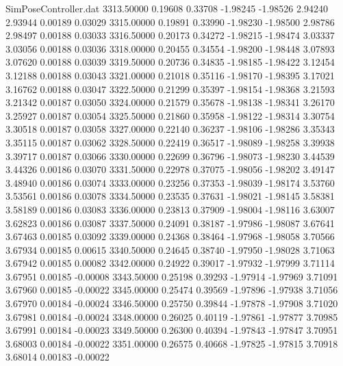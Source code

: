 \begin{filecontents}{SimPoseController.dat}
3313.50000    0.19608    0.33708    -1.98245   -1.98526    2.94240    2.93944    0.00189    0.03029
3315.00000    0.19891    0.33990    -1.98230   -1.98500    2.98786    2.98497    0.00188    0.03033
3316.50000    0.20173    0.34272    -1.98215   -1.98474    3.03337    3.03056    0.00188    0.03036
3318.00000    0.20455    0.34554    -1.98200   -1.98448    3.07893    3.07620    0.00188    0.03039
3319.50000    0.20736    0.34835    -1.98185   -1.98422    3.12454    3.12188    0.00188    0.03043
3321.00000    0.21018    0.35116    -1.98170   -1.98395    3.17021    3.16762    0.00188    0.03047
3322.50000    0.21299    0.35397    -1.98154   -1.98368    3.21593    3.21342    0.00187    0.03050
3324.00000    0.21579    0.35678    -1.98138   -1.98341    3.26170    3.25927    0.00187    0.03054
3325.50000    0.21860    0.35958    -1.98122   -1.98314    3.30754    3.30518    0.00187    0.03058
3327.00000    0.22140    0.36237    -1.98106   -1.98286    3.35343    3.35115    0.00187    0.03062
3328.50000    0.22419    0.36517    -1.98089   -1.98258    3.39938    3.39717    0.00187    0.03066
3330.00000    0.22699    0.36796    -1.98073   -1.98230    3.44539    3.44326    0.00186    0.03070
3331.50000    0.22978    0.37075    -1.98056   -1.98202    3.49147    3.48940    0.00186    0.03074
3333.00000    0.23256    0.37353    -1.98039   -1.98174    3.53760    3.53561    0.00186    0.03078
3334.50000    0.23535    0.37631    -1.98021   -1.98145    3.58381    3.58189    0.00186    0.03083
3336.00000    0.23813    0.37909    -1.98004   -1.98116    3.63007    3.62823    0.00186    0.03087
3337.50000    0.24091    0.38187    -1.97986   -1.98087    3.67641    3.67463    0.00185    0.03092
3339.00000    0.24368    0.38464    -1.97968   -1.98058    3.70566    3.67934    0.00185    0.00615
3340.50000    0.24645    0.38740    -1.97950   -1.98028    3.71063    3.67942    0.00185    0.00082
3342.00000    0.24922    0.39017    -1.97932   -1.97999    3.71114    3.67951    0.00185   -0.00008
3343.50000    0.25198    0.39293    -1.97914   -1.97969    3.71091    3.67960    0.00185   -0.00022
3345.00000    0.25474    0.39569    -1.97896   -1.97938    3.71056    3.67970    0.00184   -0.00024
3346.50000    0.25750    0.39844    -1.97878   -1.97908    3.71020    3.67981    0.00184   -0.00024
3348.00000    0.26025    0.40119    -1.97861   -1.97877    3.70985    3.67991    0.00184   -0.00023
3349.50000    0.26300    0.40394    -1.97843   -1.97847    3.70951    3.68003    0.00184   -0.00022
3351.00000    0.26575    0.40668    -1.97825   -1.97815    3.70918    3.68014    0.00183   -0.00022

\end{filecontents}
